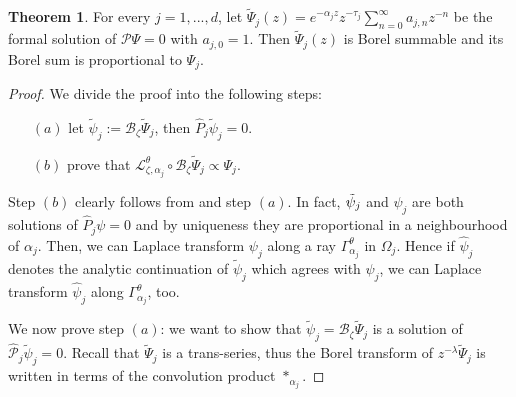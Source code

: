 \documentclass{article}
\theoremstyle{definition}
\newcommand{\series}[1]{\tilde{#1}}
\newcommand{\laplace}{\mathcal{L}}
\newcommand{\borel}{\mathcal{B}}
\newtheorem{theorem}{Theorem}[section]
\begin{document}
\begin{theorem}\label{thm2-dim}
For every $j=1,...,d$, let $\tilde{\Psi}_j(z)=e^{-\alpha_j z}z^{-\tau_j}\sum_{n=0}^{\infty}a_{j,n}z^{-n}$ be the formal solution of $\mathcal{P}\Psi=0$ with $a_{j,0}=1$. Then $\series{\Psi}_j(z)$ is Borel summable and its Borel sum is proportional to $\Psi_j$. 
\end{theorem}
\begin{proof}
We divide the proof into the following steps:
\begin{itemize}
\item[$(a)$] let $\series{\psi}_j:=\borel_{\zeta}\series{\Psi}_j$, then $\hat{P}_j\series{\psi}_j=0$.
\item[$(b)$] prove that $\laplace_{\zeta,\alpha_j}^{\theta}\circ\borel_\zeta\series{\Psi}_j\propto \Psi_j $. 
\end{itemize}

Step $(b)$ clearly follows from \cite[Theorem 4]{reg-sing-volterra} and step $(a)$. In fact, $\Tilde{\psi}_j$ and ${\psi}_j$ are both solutions of $\hat{P}_j\psi=0$ and by uniqueness they are proportional in a neighbourhood of $\alpha_j$. Then, we can Laplace transform ${\psi}_j$ along a ray $\Gamma_{\alpha_j}^\theta$ in $\Omega_j$. Hence if $\hat{\psi}_j$ denotes the analytic continuation of $\tilde{\psi}_j$ which agrees with $\psi_j$, we can Laplace transform $\hat{\psi}_j$ along $\Gamma_{\alpha_j}^\theta$, too. 

We now prove step $(a)$: we want to show that $\series{\psi}_j=\borel_{\zeta}\series{\Psi}_j$ is a solution of $\hat{\mathcal{P}}_j\series{\psi}_j=0$. Recall that $\tilde{\Psi}_j$ is a trans-series, thus the Borel transform of $z^{-\lambda}\tilde{\Psi}_j$ is written in terms of the convolution product $\ast_{\alpha_j}$.   




\end{proof}
\end{document}
